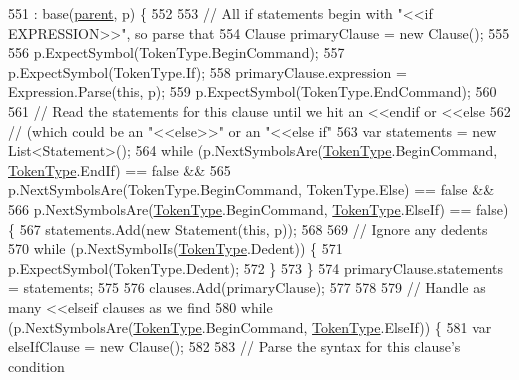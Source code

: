 \begin{DoxyCode}
551                                                              : base(\hyperlink{a00063_af313a82103fcc2ff5a177dbb06b92f7b}{parent}, p) \{
552 
553                 \textcolor{comment}{// All if statements begin with "<<if EXPRESSION>>", so parse that}
554                 Clause primaryClause = \textcolor{keyword}{new} Clause();
555 
556                 p.ExpectSymbol(TokenType.BeginCommand);
557                 p.ExpectSymbol(TokenType.If);
558                 primaryClause.expression = Expression.Parse(\textcolor{keyword}{this}, p);
559                 p.ExpectSymbol(TokenType.EndCommand);
560 
561                 \textcolor{comment}{// Read the statements for this clause until  we hit an <<endif or <<else}
562                 \textcolor{comment}{// (which could be an "<<else>>" or an "<<else if"}
563                 var statements = \textcolor{keyword}{new} List<Statement>();
564                 \textcolor{keywordflow}{while} (p.NextSymbolsAre(\hyperlink{a00026_a301aa7c866593a5b625a8fc158bbeace}{TokenType}.BeginCommand, 
      \hyperlink{a00026_a301aa7c866593a5b625a8fc158bbeace}{TokenType}.EndIf) == \textcolor{keyword}{false} &&
565                     p.NextSymbolsAre(TokenType.BeginCommand, TokenType.Else) == \textcolor{keyword}{false} &&
566                     p.NextSymbolsAre(\hyperlink{a00026_a301aa7c866593a5b625a8fc158bbeace}{TokenType}.BeginCommand, \hyperlink{a00026_a301aa7c866593a5b625a8fc158bbeace}{TokenType}.ElseIf) == \textcolor{keyword}{false}) 
      \{
567                     statements.Add(\textcolor{keyword}{new} Statement(\textcolor{keyword}{this}, p));
568 
569                     \textcolor{comment}{// Ignore any dedents}
570                     \textcolor{keywordflow}{while} (p.NextSymbolIs(\hyperlink{a00026_a301aa7c866593a5b625a8fc158bbeace}{TokenType}.Dedent)) \{
571                         p.ExpectSymbol(TokenType.Dedent);
572                     \}
573                 \}
574                 primaryClause.statements = statements;
575 
576                 clauses.Add(primaryClause);
577 
578 
579                 \textcolor{comment}{// Handle as many <<elseif clauses as we find}
580                 \textcolor{keywordflow}{while} (p.NextSymbolsAre(\hyperlink{a00026_a301aa7c866593a5b625a8fc158bbeace}{TokenType}.BeginCommand, 
      \hyperlink{a00026_a301aa7c866593a5b625a8fc158bbeace}{TokenType}.ElseIf)) \{
581                     var elseIfClause = \textcolor{keyword}{new} Clause();
582 
583                     \textcolor{comment}{// Parse the syntax for this clause's condition}

\end{DoxyCode}

